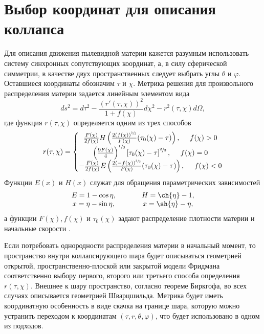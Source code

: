 \documentclass[12pt]{article}
\newcommand{\bq}{\begin{equation}}
\newcommand{\eq}{\end{equation}}
\begin{document}
\section{Выбор координат для описания коллапса}
Для описания движения пылевидной материи кажется разумным использовать систему синхронных сопутствующих координат, а, в силу сферической симметрии, в качестве двух пространственных следует выбрать углы $\theta$ и $\varphi$. Оставшиеся координаты обозначим $\tau$ и $\chi$. Метрика решения для произвольного распределения материи задается линейным элементом вида
\bq
\label{metric}
	d s^2 = d \tau^2 - \frac{(r'(\tau, \chi))^2}{1+f(\chi)} d\chi^2 - r^2(\tau, \chi) d \Omega,
\eq
где функция $r(\tau, \chi)$ определяется одним из трех способов
\bq
	r(\tau, \chi) = \left\{
	\begin{matrix}
	\frac{F(\chi)}{2 f(\chi)} H \left( \frac{2(f(\chi))^{\sfrac{3}{2}} }{F(\chi)}(\tau_0(\chi)-\tau)  \right) , \ \ \ \ f(\chi) > 0\\
	\left( \frac{9F(\chi)}{4} \right)^{\sfrac{1}{3}} \left[ \tau_0(\chi)- \tau \right]^{\sfrac{2}{3}}, \ \ \ \ f(\chi) = 0 \\
	- \frac{F(\chi)}{2 f(\chi)} E \left( \frac{2(-f(\chi))^{\sfrac{3}{2}} }{F(\chi)}(\tau_0(\chi)-\tau) \right), \ \ \ \ f(\chi) < 0  
	\end{matrix} \right.
\eq
Функции $E(x)$ и $H(x)$  служат для обращения параметрических зависимостей
\bq
	\begin{array}{c}
	E = 1 - \cos{\eta}, \\
	x = \eta - \sin{\eta},
	\end{array} \ \ \ \ \ \ \ \
	\begin{array}{c}
	H = \ch{\eta}-1, \\
	x = \sh{\eta} - \eta,
	\end{array}
\eq
а функции $F(\chi), f(\chi)$ и $\tau_0(\chi)$ задают распределение плотности материи и начальные скорости \cite{landau}.

Если потребовать однородности распределения материи в начальный момент, то пространство внутри коллапсирующего шара будет описываться геометрией открытой, пространственно-плоской или закрытой модели Фридмана соответственно выбору первого, второго или третьего способа определения $r(\tau, \chi)$. Внешнее к шару пространство, согласно теореме Биркгофа, во всех случаях описывается геометрией Шварцшильда. Метрика будет иметь координатную особенность в виде скачка на границе шара, которую можно устранить переходом к координатам $(\tau, r, \theta, \varphi)$, что будет использовано в одном из подходов. 
\end{document}

